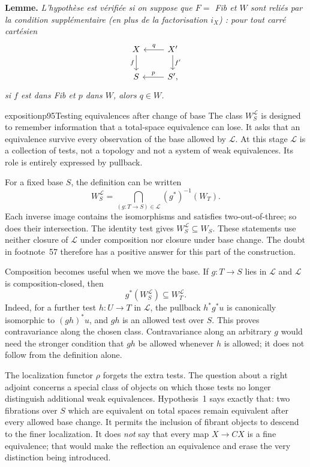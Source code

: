 \textbf{Lemme.} \textit{L'hypothèse est vérifiée si on suppose}  \textit{que $F =$ Fib et $W$ sont reliés par la condition supplémentaire (en plus de la factorisation $i_X$) : pour tout carré cartésien}
\[
\begin{tikzcd}
X \arrow[d, "f"'] & X' \arrow[l, "q"'] \arrow[d, "f'"] \\
S & S', \arrow[l, "p"']
\end{tikzcd}
\]
\textit{si $f$ est dans Fib et $p$ dans $W$, alors $q \in W$.}

\begin{dcomment}{exposition}{p95}{Testing equivalences after change of base}
The class $W_S^{\mathcal L}$ is designed to remember information that a total-space equivalence can lose. It asks that an equivalence survive every observation of the base allowed by $\mathcal L$. At this stage $\mathcal L$ is a collection of tests, not a topology and not a system of weak equivalences. Its role is entirely expressed by pullback.

For a fixed base $S$, the definition can be written
\[
 W_S^{\mathcal L}
 =\bigcap_{(g:T\to S)\in\mathcal L}(g^*)^{-1}(W_T).
\]
Each inverse image contains the isomorphisms and satisfies two-out-of-three; so does their intersection. The identity test gives $W_S^{\mathcal L}\subseteq W_S$. These statements use neither closure of $\mathcal L$ under composition nor closure under base change. The doubt in footnote~57 therefore has a positive answer for this part of the construction.

Composition becomes useful when we move the base. If $g:T\to S$ lies in $\mathcal L$ and $\mathcal L$ is composition-closed, then
\[
 g^*(W_S^{\mathcal L})\subseteq W_T^{\mathcal L}.
\]
Indeed, for a further test $h:U\to T$ in $\mathcal L$, the pullback $h^*g^*u$ is canonically isomorphic to $(gh)^*u$, and $gh$ is an allowed test over $S$. This proves contravariance along the chosen class. Contravariance along an arbitrary $g$ would need the stronger condition that $gh$ be allowed whenever $h$ is allowed; it does not follow from the definition alone.

The localization functor $\rho$ forgets the extra tests. The question about a right adjoint concerns a special class of objects on which those tests no longer distinguish additional weak equivalences. Hypothesis~1 says exactly that: two fibrations over $S$ which are equivalent on total spaces remain equivalent after every allowed base change. It permits the inclusion of fibrant objects to descend to the finer localization. It does \emph{not} say that every map $X\to CX$ is a fine equivalence; that would make the reflection an equivalence and erase the very distinction being introduced.


\end{dcomment}
